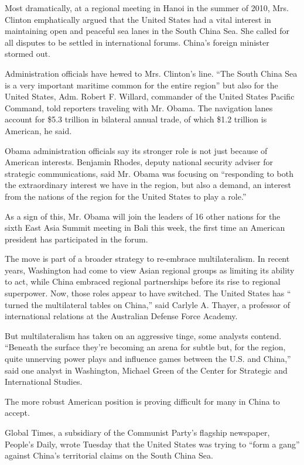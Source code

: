 Most dramatically, at a regional meeting in Hanoi in the summer of 2010,
Mrs. Clinton emphatically argued that the United States had a vital
interest in maintaining open and peaceful sea lanes in the South China
Sea. She called for all disputes to be settled in international forums.
China's foreign minister stormed out.

Administration officials have hewed to Mrs. Clinton's line. ``The South
China Sea is a very important maritime common for the entire region''
but also for the United States, Adm. Robert F. Willard, commander of the
United States Pacific Command, told reporters traveling with Mr. Obama.
The navigation lanes account for \$5.3 trillion in bilateral annual
trade, of which \$1.2 trillion is American, he said.

Obama administration officials say its stronger role is not just because
of American interests. Benjamin Rhodes, deputy national security adviser
for strategic communications, said Mr. Obama was focusing on
``responding to both the extraordinary interest we have in the region,
but also a demand, an interest from the nations of the region for the
United States to play a role.''

As a sign of this, Mr. Obama will join the leaders of 16 other nations
for the sixth East Asia Summit meeting in Bali this week, the first time
an American president has participated in the forum.

The move is part of a broader strategy to re-embrace multilateralism. In
recent years, Washington had come to view Asian regional groups as
limiting its ability to act, while China embraced regional partnerships
before its rise to regional superpower. Now, those roles appear to have
switched. The United States has `` turned the multilateral tables on
China,'' said Carlyle A. Thayer, a professor of international relations
at the Australian Defense Force Academy.

But multilateralism has taken on an aggressive tinge, some analysts
contend. ``Beneath the surface they're becoming an arena for subtle but,
for the region, quite unnerving power plays and influence games between
the U.S. and China,'' said one analyst in Washington, Michael Green of
the Center for Strategic and International Studies.

The more robust American position is proving difficult for many in China
to accept.

Global Times, a subsidiary of the Communist Party's flagship newspaper,
People's Daily, wrote Tuesday that the United States was trying to
``form a gang'' against China's territorial claims on the South China
Sea.

